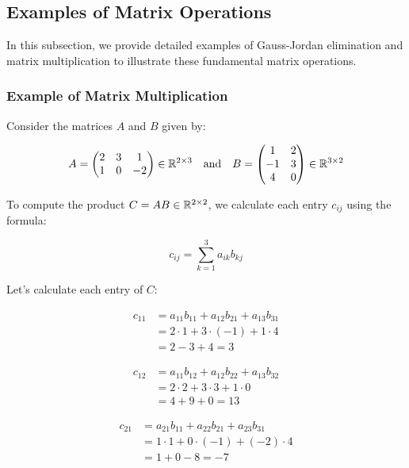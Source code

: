 \subsection{Examples of Matrix Operations}

In this subsection, we provide detailed examples of Gauss-Jordan elimination and matrix multiplication to illustrate these fundamental matrix operations.

\subsubsection{Example of Matrix Multiplication}

Consider the matrices \(A\) and \(B\) given by:

\[
    A = 
    \begin{pmatrix}
    2 & 3 & 1 \\
    1 & 0 & -2
    \end{pmatrix} \in \mathbb{R}^{2 \times 3}
    \quad \text{and} \quad
    B = 
    \begin{pmatrix}
    1 & 2 \\
    -1 & 3 \\
    4 & 0
    \end{pmatrix} \in \mathbb{R}^{3 \times 2}
\]

To compute the product \(C = AB \in \mathbb{R}^{2 \times 2}\), we calculate each entry \(c_{ij}\) using the formula:

\[
    c_{ij} = \sum_{k=1}^{3} a_{ik} b_{kj}
\]

Let's calculate each entry of \(C\):

\begin{align*}
    c_{11} &= a_{11}b_{11} + a_{12}b_{21} + a_{13}b_{31} \\
    &= 2 \cdot 1 + 3 \cdot (-1) + 1 \cdot 4 \\
    &= 2 - 3 + 4 = 3
\end{align*}

\begin{align*}
    c_{12} &= a_{11}b_{12} + a_{12}b_{22} + a_{13}b_{32} \\
    &= 2 \cdot 2 + 3 \cdot 3 + 1 \cdot 0 \\
    &= 4 + 9 + 0 = 13
\end{align*}

\begin{align*}
    c_{21} &= a_{21}b_{11} + a_{22}b_{21} + a_{23}b_{31} \\
    &= 1 \cdot 1 + 0 \cdot (-1) + (-2) \cdot 4 \\
    &= 1 + 0 - 8 = -7
\end{align*}

